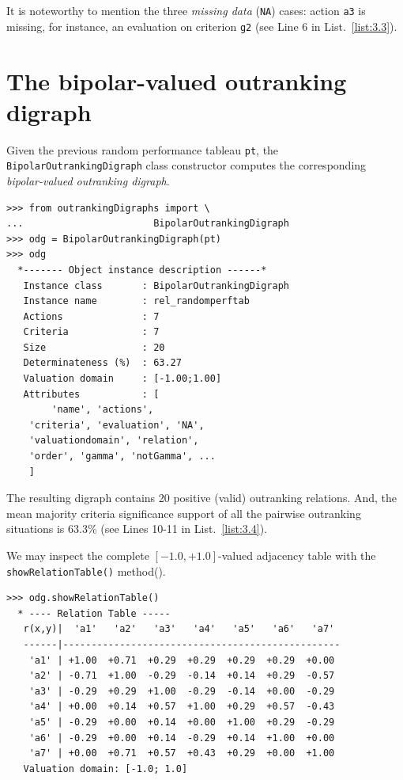 It is noteworthy to mention the three \emph{missing data} (\texttt{NA}) cases: action \texttt{a3} is missing, for instance, an evaluation on criterion \texttt{g2} (see Line 6 in List.~\vref{list:3.3}).
    
\section{The bipolar-valued outranking digraph}
\label{sec:3.2}

Given the previous random performance tableau \texttt{pt}, the \texttt{BipolarOutranking\-Digraph} class constructor computes the corresponding \emph{bipolar-valued outranking digraph}. 
\begin{lstlisting}[caption={Example of random bipolar-valued outranking digraph.},label=list:3.4]
>>> from outrankingDigraphs import \
...                       BipolarOutrankingDigraph
>>> odg = BipolarOutrankingDigraph(pt)
>>> odg
  *------- Object instance description ------*
   Instance class       : BipolarOutrankingDigraph
   Instance name        : rel_randomperftab
   Actions              : 7
   Criteria             : 7
   Size                 : 20
   Determinateness (%)  : 63.27
   Valuation domain     : [-1.00;1.00]
   Attributes           : [
        'name', 'actions', 
	'criteria', 'evaluation', 'NA',
	'valuationdomain', 'relation', 
	'order', 'gamma', 'notGamma', ...
	]
\end{lstlisting}

The resulting digraph contains 20 positive (valid) outranking relations. And, the mean majority criteria significance support of all the pairwise outranking situations is $63.3\%$ (see Lines 10-11 in List.~\vref{list:3.4}).

We may inspect the complete $[-1.0,+1.0]$-valued adjacency table with the \texttt{showRelationTable()} method().
\begin{lstlisting}[caption={Inspecting the valued adjacency table.},label=list:3.5]
>>> odg.showRelationTable()
  * ---- Relation Table -----
   r(x,y)|  'a1'   'a2'   'a3'   'a4'   'a5'   'a6'   'a7'   
   ------|-------------------------------------------------
    'a1' | +1.00  +0.71  +0.29  +0.29  +0.29  +0.29  +0.00  
    'a2' | -0.71  +1.00  -0.29  -0.14  +0.14  +0.29  -0.57  
    'a3' | -0.29  +0.29  +1.00  -0.29  -0.14  +0.00  -0.29  
    'a4' | +0.00  +0.14  +0.57  +1.00  +0.29  +0.57  -0.43  
    'a5' | -0.29  +0.00  +0.14  +0.00  +1.00  +0.29  -0.29  
    'a6' | -0.29  +0.00  +0.14  -0.29  +0.14  +1.00  +0.00  
    'a7' | +0.00  +0.71  +0.57  +0.43  +0.29  +0.00  +1.00  
   Valuation domain: [-1.0; 1.0]
\end{lstlisting}

